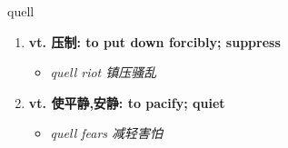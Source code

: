 
\begin{frame}
{\huge quell}
\begin{center}
\begin{enumerate}\Large
  \item \textbf{vt. 压制: to put down forcibly; suppress}
  \begin{itemize}
    \item \em{\Large{quell riot 镇压骚乱}}
  \end{itemize}
  \item \textbf{vt. 使平静,安静: to pacify; quiet}
  \begin{itemize}
    \item \em{\Large{quell fears 减轻害怕}}
  \end{itemize}
\end{enumerate}
\end{center}
\end{frame}
